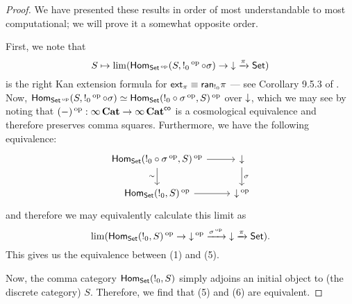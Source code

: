 \begin{proof}
We have presented these results in order of most understandable to most
computational; we will prove it a somewhat opposite order.

First, we note that 
$$S \mapsto \lim(\Hom_{\Set\op}(S, !_0\op \circ \sigma) \to \down \xto{\pi} \Set)$$
is the right Kan extension formula for $\ext_{\pi} \equiv
\term{ran}_{!_0} \pi$ --- see Corollary 9.5.3 of \cite{RV:Elements}. Now,
$\Hom_{\Set\op}(S, !_0\op \circ \sigma) \simeq \Hom_{\Set}(!_0 \circ \sigma\op,
S)\op$ over $\down$, which we may see by noting that $(-)\op : {\infty}\Cat \to {\infty}\Cat^{\term{co}}$ is a cosmological equivalence and therefore preserves
comma squares. Furthermore, we have the following equivalence:
\[
\begin{tikzcd}
{\Hom_{\Set}(!_0 \circ \sigma\op, S)\op} \arrow[d, "\sim"'] \arrow[r] & \down \arrow[d, "\sigma"] \\
{\Hom_{\Set}(!_0, S)\op} \arrow[r]                                    & \down\op                 
\end{tikzcd}
\]
and therefore we may equivalently calculate this limit as 
$$\lim(\Hom_{\Set}(!_0, S)\op \to \down\op \xto{\sigma\op} \down \xto{\pi} \Set).$$
This gives us the equivalence between (1) and (5).

Now, the comma category $\Hom_{\Set}(!_0, S)$ simply adjoins an initial object
to (the discrete category) $S$. Therefore, we find that (5) and (6) are equivalent.


\end{proof}
